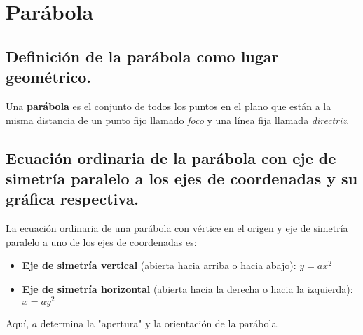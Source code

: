         
        






\section{Parábola} %
\subsection{Definición de la parábola como lugar geométrico.}
Una \textbf{parábola} es el conjunto de todos los puntos en el plano que están a la misma distancia de un punto fijo llamado \textit{foco} y una línea fija llamada \textit{directriz}.

\subsection{Ecuación ordinaria de la parábola con eje de simetría paralelo a los ejes de coordenadas y su gráfica respectiva.}
La ecuación ordinaria de una parábola con vértice en el origen y eje de simetría paralelo a uno de los ejes de coordenadas es:
\begin{itemize}
    \item \textbf{Eje de simetría vertical} (abierta hacia arriba o hacia abajo): \( y = ax^2 \)
    \item \textbf{Eje de simetría horizontal} (abierta hacia la derecha o hacia la izquierda): \( x = ay^2 \)
\end{itemize}
Aquí, \( a \) determina la "apertura" y la orientación de la parábola.

\begin{center}
\end{center}

